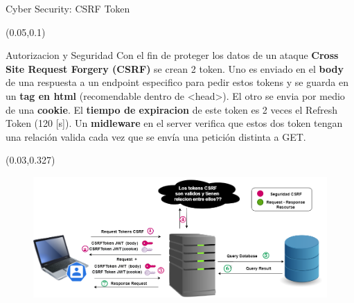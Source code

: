 \documentclass[xcolor=pdftex,dvipsnames,table]{beamer}
\begin{document}
\begin{frame}{Cyber Security: CSRF Token}
    \scriptsize{
    \begin{textblock*}{0.95\textwidth}(0.05\textwidth,0.1\textwidth)
            \begin{block}{Autorizacion y Seguridad} 
            \justifying
               Con el fin de proteger los datos de un ataque \textbf{Cross Site Request Forgery (CSRF)} se crean 2 token. Uno es enviado en el  \textbf{body} de una respuesta a un endpoint especifico para pedir estos tokens y se guarda en un \textbf{tag en html} (recomendable dentro de <head>). El otro se envia por medio de una  \textbf{cookie}. El  \textbf{tiempo de expiracion} de este token es 2 veces el Refresh Token (120 [s]). Un  \textbf{midleware} en el server verifica que estos dos token tengan una relación valida cada vez que se envía una petición distinta a GET.
                    \vspace{-0.04cm}
            \end{block}
    \end{textblock*}}
    
    
    \begin{textblock*}{1\textwidth}(0.03\textwidth,0.327\textwidth)
        \begin{figure}
            \centering
            \includegraphics[width=1\linewidth]{cyber/CSRFFLUJO.png}
            \label{fig:my_label}
        \end{figure}
    \end{textblock*}
\end{frame}
\end{document}
